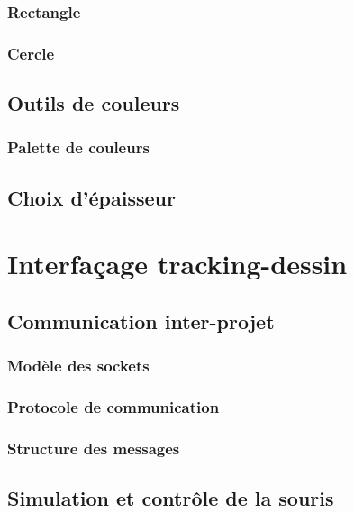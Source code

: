 \documentclass[11pt,a4paper,oldfontcommands]{memoir}
\begin{document}
\subsubsection{Rectangle}

\subsubsection{Cercle}

\subsection{Outils de couleurs}

\subsubsection{Palette de couleurs}

\subsection{Choix d'épaisseur}

\section{Interfaçage tracking-dessin}

\subsection{Communication inter-projet}

\subsubsection{Modèle des sockets}

\subsubsection{Protocole de communication}

\subsubsection{Structure des messages}

\subsection{Simulation et contrôle de la souris}
\end{document}
